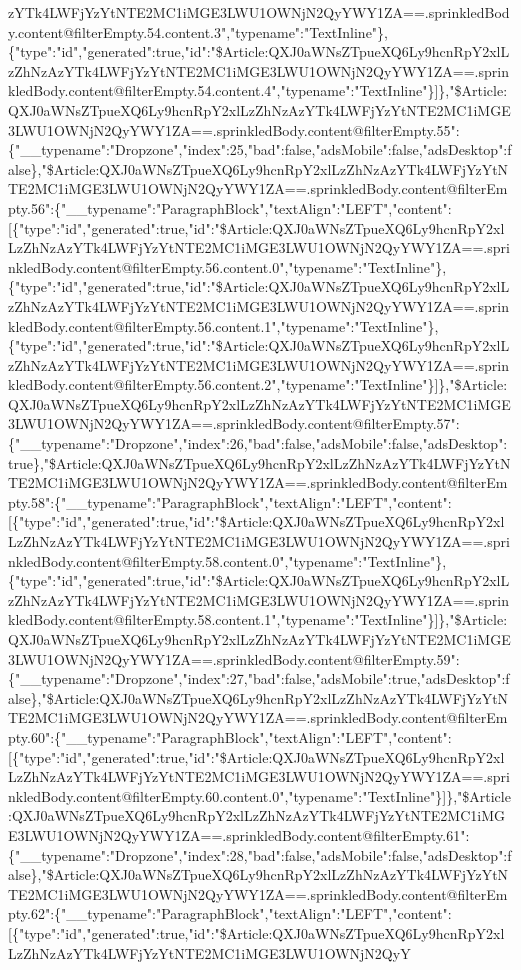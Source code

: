 zYTk4LWFjYzYtNTE2MC1iMGE3LWU1OWNjN2QyYWY1ZA==.sprinkledBody.content@filterEmpty.54.content.3","typename":"TextInline"\},\{"type":"id","generated":true,"id":"\$Article:QXJ0aWNsZTpueXQ6Ly9hcnRpY2xlLzZhNzAzYTk4LWFjYzYtNTE2MC1iMGE3LWU1OWNjN2QyYWY1ZA==.sprinkledBody.content@filterEmpty.54.content.4","typename":"TextInline"\}{]}\},"\$Article:QXJ0aWNsZTpueXQ6Ly9hcnRpY2xlLzZhNzAzYTk4LWFjYzYtNTE2MC1iMGE3LWU1OWNjN2QyYWY1ZA==.sprinkledBody.content@filterEmpty.55":\{"\_\_typename":"Dropzone","index":25,"bad":false,"adsMobile":false,"adsDesktop":false\},"\$Article:QXJ0aWNsZTpueXQ6Ly9hcnRpY2xlLzZhNzAzYTk4LWFjYzYtNTE2MC1iMGE3LWU1OWNjN2QyYWY1ZA==.sprinkledBody.content@filterEmpty.56":\{"\_\_typename":"ParagraphBlock","textAlign":"LEFT","content":{[}\{"type":"id","generated":true,"id":"\$Article:QXJ0aWNsZTpueXQ6Ly9hcnRpY2xlLzZhNzAzYTk4LWFjYzYtNTE2MC1iMGE3LWU1OWNjN2QyYWY1ZA==.sprinkledBody.content@filterEmpty.56.content.0","typename":"TextInline"\},\{"type":"id","generated":true,"id":"\$Article:QXJ0aWNsZTpueXQ6Ly9hcnRpY2xlLzZhNzAzYTk4LWFjYzYtNTE2MC1iMGE3LWU1OWNjN2QyYWY1ZA==.sprinkledBody.content@filterEmpty.56.content.1","typename":"TextInline"\},\{"type":"id","generated":true,"id":"\$Article:QXJ0aWNsZTpueXQ6Ly9hcnRpY2xlLzZhNzAzYTk4LWFjYzYtNTE2MC1iMGE3LWU1OWNjN2QyYWY1ZA==.sprinkledBody.content@filterEmpty.56.content.2","typename":"TextInline"\}{]}\},"\$Article:QXJ0aWNsZTpueXQ6Ly9hcnRpY2xlLzZhNzAzYTk4LWFjYzYtNTE2MC1iMGE3LWU1OWNjN2QyYWY1ZA==.sprinkledBody.content@filterEmpty.57":\{"\_\_typename":"Dropzone","index":26,"bad":false,"adsMobile":false,"adsDesktop":true\},"\$Article:QXJ0aWNsZTpueXQ6Ly9hcnRpY2xlLzZhNzAzYTk4LWFjYzYtNTE2MC1iMGE3LWU1OWNjN2QyYWY1ZA==.sprinkledBody.content@filterEmpty.58":\{"\_\_typename":"ParagraphBlock","textAlign":"LEFT","content":{[}\{"type":"id","generated":true,"id":"\$Article:QXJ0aWNsZTpueXQ6Ly9hcnRpY2xlLzZhNzAzYTk4LWFjYzYtNTE2MC1iMGE3LWU1OWNjN2QyYWY1ZA==.sprinkledBody.content@filterEmpty.58.content.0","typename":"TextInline"\},\{"type":"id","generated":true,"id":"\$Article:QXJ0aWNsZTpueXQ6Ly9hcnRpY2xlLzZhNzAzYTk4LWFjYzYtNTE2MC1iMGE3LWU1OWNjN2QyYWY1ZA==.sprinkledBody.content@filterEmpty.58.content.1","typename":"TextInline"\}{]}\},"\$Article:QXJ0aWNsZTpueXQ6Ly9hcnRpY2xlLzZhNzAzYTk4LWFjYzYtNTE2MC1iMGE3LWU1OWNjN2QyYWY1ZA==.sprinkledBody.content@filterEmpty.59":\{"\_\_typename":"Dropzone","index":27,"bad":false,"adsMobile":true,"adsDesktop":false\},"\$Article:QXJ0aWNsZTpueXQ6Ly9hcnRpY2xlLzZhNzAzYTk4LWFjYzYtNTE2MC1iMGE3LWU1OWNjN2QyYWY1ZA==.sprinkledBody.content@filterEmpty.60":\{"\_\_typename":"ParagraphBlock","textAlign":"LEFT","content":{[}\{"type":"id","generated":true,"id":"\$Article:QXJ0aWNsZTpueXQ6Ly9hcnRpY2xlLzZhNzAzYTk4LWFjYzYtNTE2MC1iMGE3LWU1OWNjN2QyYWY1ZA==.sprinkledBody.content@filterEmpty.60.content.0","typename":"TextInline"\}{]}\},"\$Article:QXJ0aWNsZTpueXQ6Ly9hcnRpY2xlLzZhNzAzYTk4LWFjYzYtNTE2MC1iMGE3LWU1OWNjN2QyYWY1ZA==.sprinkledBody.content@filterEmpty.61":\{"\_\_typename":"Dropzone","index":28,"bad":false,"adsMobile":false,"adsDesktop":false\},"\$Article:QXJ0aWNsZTpueXQ6Ly9hcnRpY2xlLzZhNzAzYTk4LWFjYzYtNTE2MC1iMGE3LWU1OWNjN2QyYWY1ZA==.sprinkledBody.content@filterEmpty.62":\{"\_\_typename":"ParagraphBlock","textAlign":"LEFT","content":{[}\{"type":"id","generated":true,"id":"\$Article:QXJ0aWNsZTpueXQ6Ly9hcnRpY2xlLzZhNzAzYTk4LWFjYzYtNTE2MC1iMGE3LWU1OWNjN2QyY